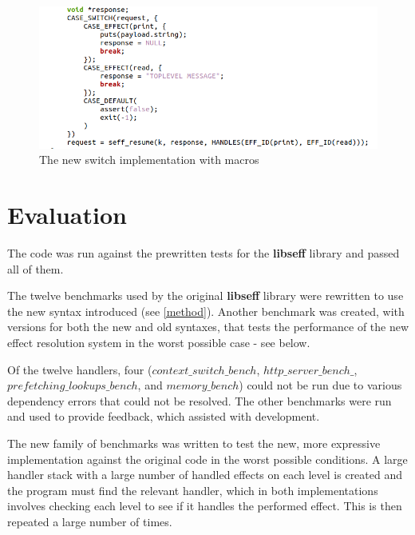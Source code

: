 \documentclass[logo,bsc,singlespacing,parskip,online]{infthesis}
\begin{document}
\begin{figure}[h]
    \centering
    \includegraphics[width=1\linewidth]{newswitch.png}
    \caption{The new switch implementation with macros}
    \label{fig:newswitch}
\end{figure}







\chapter{Evaluation}

The code was run against the prewritten tests for the \textbf{libseff} library and passed all of them.

The twelve benchmarks used by the original \textbf{libseff} library were rewritten to use the new syntax introduced (see \cref{method}). Another benchmark was created, with versions for both the new and old syntaxes, that tests the performance of the new effect resolution system in the worst possible case - see below. 

Of the twelve handlers, four ($context\_switch\_bench$, $http\_server\_bench\_$, $prefetching\_lookups\_bench$, and $memory\_bench$) could not be run due to various dependency errors that could not be resolved.  The other benchmarks were run and used to provide feedback, which assisted with development. 

The new family of benchmarks was written to test the new, more expressive implementation against the original code in the worst possible conditions. A large handler stack with a large number of handled effects on each level is created and the program must find the relevant handler, which in both implementations involves checking each level to see if it handles the performed effect. This is then repeated a large number of times.
\end{document}
